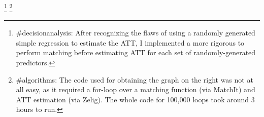 \documentclass[11pt, oneside]{article}
\begin{document}
\footnote{\#decisionanalysis: After recognizing the flaws of using a randomly generated simple regression to estimate the ATT, I implemented a more rigorous to perform matching before estimating ATT for each set of randomly-generated predictors.}
\footnote{\#algorithms: The code used for obtaining the graph on the right was not at all easy, as it required a for-loop over a matching function (via MatchIt) and ATT estimation (via Zelig). The whole code for 100,000 loops took around 3 hours to run.}
\end{document}
